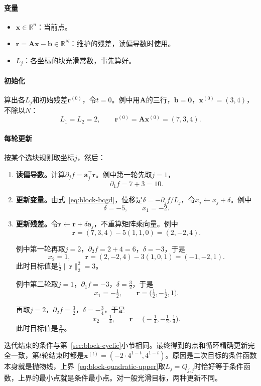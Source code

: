 \paragraph{变量}
\begin{itemize}
 \item $\bm{x}\in\mathbb{R}^n$：当前点。
 \item $\bm{r}=\bm{A}\bm{x}-\bm{b}\in\mathbb{R}^N$：维护的残差，读偏导数时使用。
 \item $L_j$：各坐标的块光滑常数，事先算好。
\end{itemize}

\paragraph{初始化}
算出各$L_j$和初始残差$\bm{r}^{(0)}$，令$t=0$。例中用$\bm{A}$的三行，$\bm{b}=\bm{0}$，$\bm{x}^{(0)}=(3,4)$，不除以$N$：
\[
 L_1=L_2=2,\qquad \bm{r}^{(0)}=\bm{A}\bm{x}^{(0)}=(7,3,4).
\]

\paragraph{每轮更新}
按某个选块规则取坐标$j$，然后：
\begin{enumerate}
 \item \textbf{读偏导数。}计算$\partial_jf=\bm{a}_j^\top\bm{r}$。例中第一轮先取$j=1$，
 \[
  \partial_1f=7+3=10 .
 \]
 \item \textbf{更新变量。}由式~\eqref{eq:block-bcgd}，位移是$\delta=-\partial_jf/L_j$，令$x_j\leftarrow x_j+\delta$。例中
 \[
  \delta=-5,\qquad x_1=-2 .
 \]
 \item \textbf{更新残差。}令$\bm{r}\leftarrow\bm{r}+\delta\bm{a}_j$，不重算矩阵乘向量。例中
 \[
  \bm{r}=(7,3,4)-5(1,1,0)=(2,-2,4).
 \]

 例中第一轮再取$j=2$，$\partial_2f=2+4=6$，$\delta=-3$，于是
 \[
  x_2=1,\qquad \bm{r}=(2,-2,4)-3(1,0,1)=(-1,-2,1).
 \]
 此时目标值是$\tfrac12\lVert\bm{r}\rVert_2^2=3$。

 例中第二轮取$j=1$，$\partial_1f=-3$，$\delta=\tfrac32$，于是
 \[
  x_1=-\tfrac12,\qquad \bm{r}=\bigl(\tfrac12,-\tfrac12,1\bigr).
 \]

 再取$j=2$，$\partial_2f=\tfrac32$，$\delta=-\tfrac34$，于是
 \[
  x_2=\tfrac14,\qquad \bm{r}=\bigl(-\tfrac14,-\tfrac12,\tfrac14\bigr).
 \]
 此时目标值是$\tfrac{3}{16}$。
\end{enumerate}

迭代结束的条件与第~\ref{sec:block-cyclic}小节相同。最终得到的点和循环精确更新完全一致，第$t$轮结束时都是$\bm{x}^{(t)}=(-2\cdot4^{1-t},4^{1-t})$。原因是二次目标的条件函数本身就是抛物线，上界~\eqref{eq:block-quadratic-upper}取$L_j=Q_{j,j}$时恰好等于条件函数，上界的最小点就是条件最小点。对一般光滑目标，两种更新不同。

